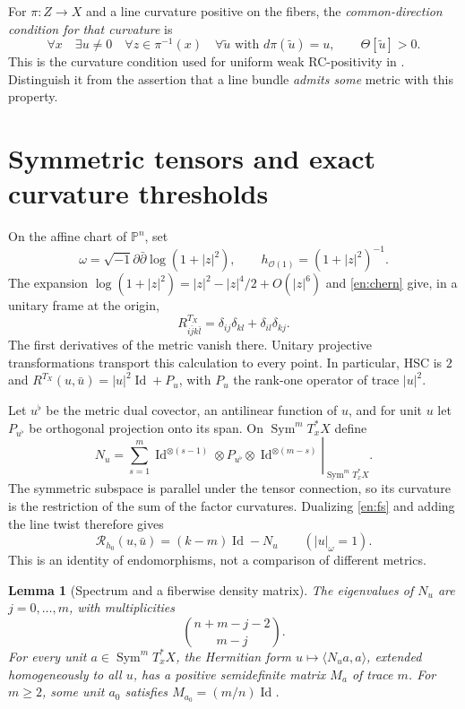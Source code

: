 \documentclass[12pt]{amsart}
\newtheorem{lem}[thm]{Lemma}
\theoremstyle{definition}
\theoremstyle{remark}
\numberwithin{equation}{section}
\DeclareMathOperator{\Id}{Id}
\DeclareMathOperator{\Sym}{Sym}
\newcommand{\Pp}{\mathbb P}
\newcommand{\ddc}{\sqrt{-1}\partial\bar\partial}
\newcommand{\eref}[1]{\eqref{en:#1}}
\begin{document}
For $\pi:Z\to X$ and a line curvature positive on the fibers, the \emph{common-direction condition for that curvature} is
\begin{equation}\label{en:common}
\forall x\quad\exists u\ne0\quad
\forall z\in\pi^{-1}(x)\quad\forall\widetilde u\text{ with }d\pi(\widetilde u)=u,
\qquad\Theta[\widetilde u]>0.
\end{equation}
This is the curvature condition used for uniform weak RC-positivity in \cite[Definition~2]{en:Wu26}. Distinguish it from the assertion that a line bundle \emph{admits some} metric with this property.

\section{Symmetric tensors and exact curvature thresholds}

On the affine chart of $\Pp^n$, set
\[
\omega=\ddc\log(1+|z|^2),\qquad
h_{\mathcal O(1)}=(1+|z|^2)^{-1}.
\]
The expansion $\log(1+|z|^2)=|z|^2-|z|^4/2+O(|z|^6)$ and \eref{chern} give, in a unitary frame at the origin,
\begin{equation}\label{en:fs}
R^{T_X}_{i\bar jk\bar l}
=\delta_{ij}\delta_{kl}+\delta_{il}\delta_{kj}.
\end{equation}
The first derivatives of the metric vanish there. Unitary projective transformations transport this calculation to every point. In particular, HSC is $2$ and $R^{T_X}(u,\bar u)=|u|^2\Id+P_u$, with $P_u$ the rank-one operator of trace $|u|^2$.

Let $u^\flat$ be the metric dual covector, an antilinear function of $u$, and for unit $u$ let $P_{u^\flat}$ be orthogonal projection onto its span. On $\Sym^m T_x^*X$ define
\begin{equation}\label{en:number}
N_u=\left.\sum_{s=1}^m
\Id^{\otimes(s-1)}\otimes P_{u^\flat}\otimes\Id^{\otimes(m-s)}
\right|_{\Sym^m T_x^*X}.
\end{equation}
The symmetric subspace is parallel under the tensor connection, so its curvature is the restriction of the sum of the factor curvatures. Dualizing \eref{fs} and adding the line twist therefore gives
\begin{equation}\label{en:operator}
\mathcal R_{h_0}(u,\bar u)=(k-m)\Id-N_u\qquad (|u|_\omega=1).
\end{equation}
This is an identity of endomorphisms, not a comparison of different metrics.

\begin{lem}[Spectrum and a fiberwise density matrix]\label{en:density}
The eigenvalues of $N_u$ are $j=0,\ldots,m$, with multiplicities
\[
\binom{n+m-j-2}{m-j}.
\]
For every unit $a\in\Sym^m T_x^*X$, the Hermitian form
$u\mapsto\langle N_u a,a\rangle$, extended homogeneously to all $u$, has a positive semidefinite matrix $M_a$ of trace $m$. For $m\ge2$, some unit $a_0$ satisfies $M_{a_0}=(m/n)\Id$.
\end{lem}
\end{document}
